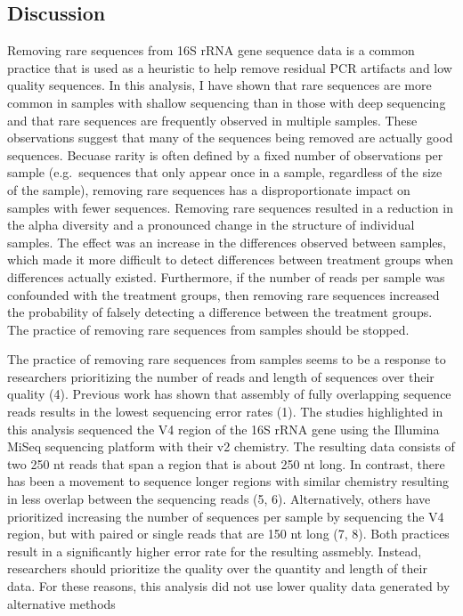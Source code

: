 \documentclass[]{article}
\begin{document}
\subsection{Discussion}\label{discussion}

Removing rare sequences from 16S rRNA gene sequence data is a common
practice that is used as a heuristic to help remove residual PCR
artifacts and low quality sequences. In this analysis, I have shown that
rare sequences are more common in samples with shallow sequencing than
in those with deep sequencing and that rare sequences are frequently
observed in multiple samples. These observations suggest that many of
the sequences being removed are actually good sequences. Becuase rarity
is often defined by a fixed number of observations per sample
(e.g.~sequences that only appear once in a sample, regardless of the
size of the sample), removing rare sequences has a disproportionate
impact on samples with fewer sequences. Removing rare sequences resulted
in a reduction in the alpha diversity and a pronounced change in the
structure of individual samples. The effect was an increase in the
differences observed between samples, which made it more difficult to
detect differences between treatment groups when differences actually
existed. Furthermore, if the number of reads per sample was confounded
with the treatment groups, then removing rare sequences increased the
probability of falsely detecting a difference between the treatment
groups. The practice of removing rare sequences from samples should be
stopped.

The practice of removing rare sequences from samples seems to be a
response to researchers prioritizing the number of reads and length of
sequences over their quality (4). Previous work has shown that assembly
of fully overlapping sequence reads results in the lowest sequencing
error rates (1). The studies highlighted in this analysis sequenced the
V4 region of the 16S rRNA gene using the Illumina MiSeq sequencing
platform with their v2 chemistry. The resulting data consists of two 250
nt reads that span a region that is about 250 nt long. In contrast,
there has been a movement to sequence longer regions with similar
chemistry resulting in less overlap between the sequencing reads (5, 6).
Alternatively, others have prioritized increasing the number of
sequences per sample by sequencing the V4 region, but with paired or
single reads that are 150 nt long (7, 8). Both practices result in a
significantly higher error rate for the resulting assmebly. Instead,
researchers should prioritize the quality over the quantity and length
of their data. For these reasons, this analysis did not use lower
quality data generated by alternative methods
\end{document}

